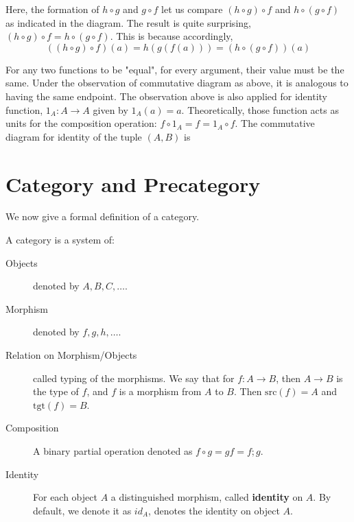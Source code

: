 Here, the formation of $h\circ g$ and $g \circ f$ let us compare $(h\circ g)\circ f$ and $h \circ (g \circ f)$ as indicated in the diagram. The result is quite surprising, $(h\circ g)\circ f = h \circ (g \circ f)$. This is because accordingly, 
\begin{equation*}
    ((h\circ g) \circ f)(a) = h(g(f(a))) = (h\circ (g \circ f))(a)
\end{equation*}

For any two functions to be "equal", for every argument, their value must be the same. Under the observation of commutative diagram as above, it is analogous to having the same endpoint. The observation above is also applied for identity function, $1_A : A \longrightarrow A$ given by $1_A (a)=a$. Theoretically, those function acts as units for the composition operation: $f \circ 1_A = f = 1_A \circ f$. The commutative diagram for identity of the tuple $(A,B)$ is

\begin{center}
    {
    }
\end{center}

\section{Category and Precategory}
We now give a formal definition of a category. 
\begin{definition}
    A category is a system of: 
    \begin{description}
        \item[Objects] denoted by $A,B,C,\dots$.
        \item[Morphism] denoted by $f,g,h,\dots$.
        \item[Relation on Morphism/Objects] called typing of the morphisms. We say that for $f:A\to B$, then $A\to B$ is the type of $f$, and $f$ is a morphism from $A$ to $B$. Then $\mathrm{src}(f)=A$ and $\mathrm{tgt}(f)=B$.
        \item[Composition] A binary partial operation denoted as $f \circ g=gf=f;g$.
        \item[Identity] For each object $A$ a distinguished morphism, called \textbf{identity} on $A$. By default, we denote it as $id_{A}$, denotes the identity on object $A$.  
    \end{description}
\end{definition}



